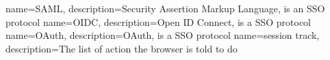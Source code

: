 
{
    name=SAML,
    description={Security Assertion Markup Language, is an SSO protocol}
}
{
    name=OIDC,
    description={Open ID Connect, is a SSO protocol} 
}
{
    name=OAuth,
    description={OAuth, is a SSO protocol}
}
{
    name=session track,
    description={The list of action the browser is told to do}
}

\makeglossaries